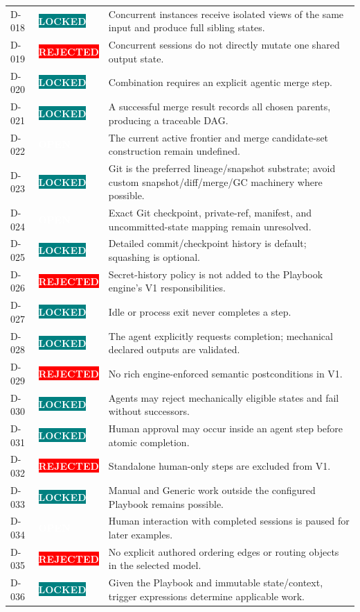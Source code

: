 \documentclass[11pt]{article}
\newcommand{\statuspill}[2]{%
  \begingroup\setlength{\fboxsep}{3pt}%
  \colorbox{#1}{\textcolor{white}{\sffamily\bfseries\scriptsize #2}}%
  \endgroup}
\newcommand{\Locked}{\statuspill{Teal}{LOCKED}}
\newcommand{\Open}{\statuspill{Amber}{OPEN}}
\newcommand{\Rejected}{\statuspill{Red}{REJECTED}}
\begin{document}
\begin{longtable}{@{}L{0.52in}L{0.88in}L{5.10in}@{}}
D-018 & \Locked & Concurrent instances receive isolated views of the same input and produce full sibling states. \\
D-019 & \Rejected & Concurrent sessions do not directly mutate one shared output state. \\
D-020 & \Locked & Combination requires an explicit agentic merge step. \\
D-021 & \Locked & A successful merge result records all chosen parents, producing a traceable DAG. \\
D-022 & \Open & The current active frontier and merge candidate-set construction remain undefined. \\
D-023 & \Locked & Git is the preferred lineage/snapshot substrate; avoid custom snapshot/diff/merge/GC machinery where possible. \\
D-024 & \Open & Exact Git checkpoint, private-ref, manifest, and uncommitted-state mapping remain unresolved. \\
D-025 & \Locked & Detailed commit/checkpoint history is default; squashing is optional. \\
D-026 & \Rejected & Secret-history policy is not added to the Playbook engine's V1 responsibilities. \\
D-027 & \Locked & Idle or process exit never completes a step. \\
D-028 & \Locked & The agent explicitly requests completion; mechanical declared outputs are validated. \\
D-029 & \Rejected & No rich engine-enforced semantic postconditions in V1. \\
D-030 & \Locked & Agents may reject mechanically eligible states and fail without successors. \\
D-031 & \Locked & Human approval may occur inside an agent step before atomic completion. \\
D-032 & \Rejected & Standalone human-only steps are excluded from V1. \\
D-033 & \Locked & Manual and Generic work outside the configured Playbook remains possible. \\
D-034 & \Open & Human interaction with completed sessions is paused for later examples. \\
D-035 & \Rejected & No explicit authored ordering edges or routing objects in the selected model. \\
D-036 & \Locked & Given the Playbook and immutable state/context, trigger expressions determine applicable work. \\

\end{longtable}
\end{document}
